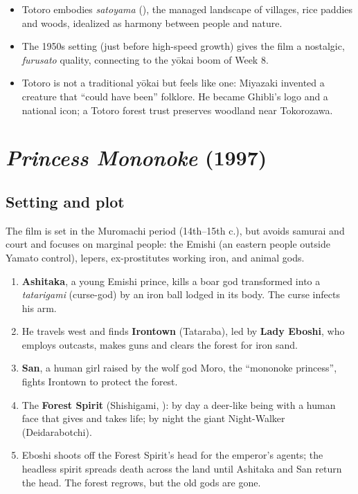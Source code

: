 \begin{important}
\begin{itemize}
  \item Totoro embodies \emph{satoyama} (), the managed landscape of villages,
        rice paddies and woods, idealized as harmony between people and nature.
  \item The 1950s setting (just before high-speed growth) gives the film a nostalgic,
        \emph{furusato} quality, connecting to the yōkai boom of Week 8.
  \item Totoro is not a traditional yōkai but feels like one: Miyazaki invented a creature
        that ``could have been'' folklore. He became Ghibli's logo and a national icon;
        a Totoro forest trust preserves woodland near Tokorozawa.
\end{itemize}
\end{important}

\section{\emph{Princess Mononoke} (1997)}

\subsection{Setting and plot}

The film is set in the Muromachi period (14th--15th c.), but avoids samurai and court and
focuses on marginal people: the Emishi (an eastern people outside Yamato control), lepers,
ex-prostitutes working iron, and animal gods.

\begin{enumerate}
  \item \textbf{Ashitaka}, a young Emishi prince, kills a boar god transformed into a
        \emph{tatarigami} (curse-god) by an iron ball lodged in its body. The curse
        infects his arm.
  \item He travels west and finds \textbf{Irontown} (Tataraba), led by \textbf{Lady Eboshi},
        who employs outcasts, makes guns and clears the forest for iron sand.
  \item \textbf{San}, a human girl raised by the wolf god Moro, the ``mononoke
        princess'', fights Irontown to protect the forest.
  \item The \textbf{Forest Spirit} (Shishigami, ): by day a deer-like being with
        a human face that gives and takes life; by night the giant Night-Walker
        (Deidarabotchi).
  \item Eboshi shoots off the Forest Spirit's head for the emperor's agents; the headless
        spirit spreads death across the land until Ashitaka and San return the head. The
        forest regrows, but the old gods are gone.
\end{enumerate}

